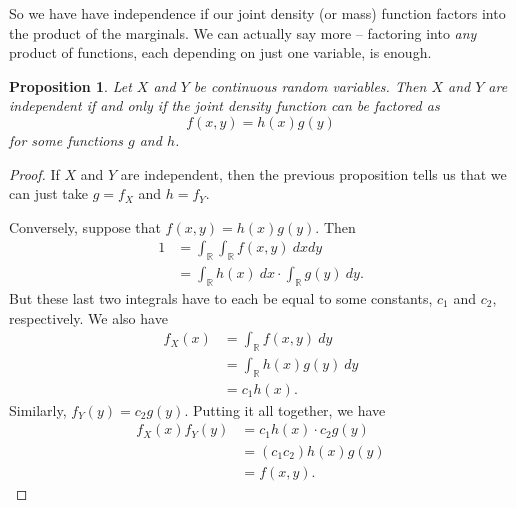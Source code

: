\documentclass[12pt]{article}
\theoremstyle{plain}
\newtheorem{proposition}[theorem]{Proposition}
\theoremstyle{definition}
\theoremstyle{remark}
\newcommand{\R}{\mathbb{R}}
\begin{document}
So we have have independence if our joint density (or mass) function factors into the product of the marginals.
We can actually say more -- factoring into \emph{any} product of functions, each depending on just one variable, is enough.
\begin{proposition}
    Let $X$ and $Y$ be continuous random variables.
    Then $X$ and $Y$ are independent if and only if the joint density function can be factored as
    \begin{equation}\label{joint factors}
        f(x,y) = h(x)g(y)
    \end{equation}  
    for some functions $g$ and $h$.
\end{proposition}
\begin{proof}
    If $X$ and $Y$ are independent, then the previous proposition tells us that we can just take $g = f_X$ and $h = f_Y$.

    Conversely, suppose that $f(x,y) = h(x)g(y)$.
    Then
    \begin{align*}
        1 &= \int_\R\int_\R f(x,y)\ dxdy\\
        &= \int_\R h(x)\ dx\cdot \int_\R g(y)\ dy.
    \end{align*}
    But these last two integrals have to each be equal to some constants, $c_1$ and $c_2$, respectively.
    We also have
    \begin{align*}
        f_X(x) &= \int_\R f(x,y)\ dy\\
        &= \int_\R h(x)g(y)\ dy\\
        &= c_1 h(x).
    \end{align*}
    Similarly, $f_Y(y) = c_2g(y)$.
    Putting it all together, we have
    \begin{align*}
        f_X(x)f_Y(y) &= c_1h(x)\cdot c_2g(y)\\
        &= (c_1c_2)h(x)g(y)\\
        &= f(x,y).
    \end{align*}
\end{proof}
\end{document}
